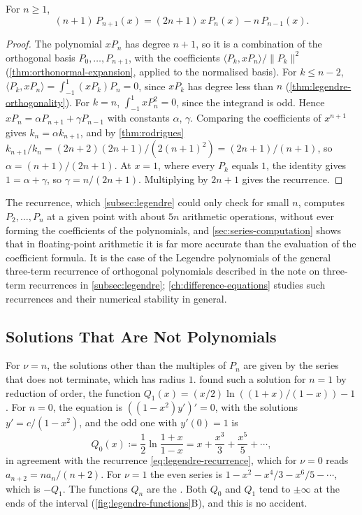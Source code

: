 \begin{theorem}
\label{thm:legendre-recurrence}
For $n\ge1$,
\[
(n+1)\,P_{n+1}(x)=(2n+1)\,x\,P_n(x)-n\,P_{n-1}(x) .
\]
\end{theorem}

\begin{proof}
The polynomial $xP_n$ has degree $n+1$, so it is a combination of the orthogonal basis $P_0,\ldots,P_{n+1}$, with the coefficients $\langle P_k,xP_n\rangle/\|P_k\|^2$ (\cref{thm:orthonormal-expansion}, applied to the normalised basis). For $k\le n-2$, $\langle P_k,xP_n\rangle=\int_{-1}^1(xP_k)P_n=0$, since $xP_k$ has degree less than $n$ (\cref{thm:legendre-orthogonality}). For $k=n$, $\int_{-1}^1xP_n^2=0$, since the integrand is odd. Hence $xP_n=\alpha P_{n+1}+\gamma P_{n-1}$ with constants $\alpha$, $\gamma$. Comparing the coefficients of $x^{n+1}$ gives $k_n=\alpha k_{n+1}$, and by \cref{thm:rodrigues} $k_{n+1}/k_n=(2n+2)(2n+1)/(2(n+1)^2)=(2n+1)/(n+1)$, so $\alpha=(n+1)/(2n+1)$. At $x=1$, where every $P_k$ equals $1$, the identity gives $1=\alpha+\gamma$, so $\gamma=n/(2n+1)$. Multiplying by $2n+1$ gives the recurrence.
\end{proof}

The recurrence, which \cref{subsec:legendre} could only check for small $n$, computes $P_2,\ldots,P_n$ at a given point with about $5n$ arithmetic operations, without ever forming the coefficients of the polynomials, and \cref{sec:series-computation} shows that in floating-point arithmetic it is far more accurate than the evaluation of the coefficient formula. It is the case of the Legendre polynomials of the general three-term recurrence of orthogonal polynomials described in the note on three-term recurrences in \cref{subsec:legendre}; \cref{ch:difference-equations} studies such recurrences and their numerical stability in general.

\subsection{Solutions That Are Not Polynomials}

For $\nu=n$, the solutions other than the multiples of $P_n$ are given by the series that does not terminate, which has radius $1$.  found such a solution for $n=1$ by reduction of order, the function $Q_1(x)=(x/2)\ln((1+x)/(1-x))-1$. For $n=0$, the equation is $((1-x^2)y')'=0$, with the solutions $y'=c/(1-x^2)$, and the odd one with $y'(0)=1$ is
\[
Q_0(x)\coloneqq\frac12\ln\frac{1+x}{1-x}=x+\frac{x^3}3+\frac{x^5}5+\cdots ,
\]
in agreement with the recurrence \eqref{eq:legendre-recurrence}, which for $\nu=0$ reads $a_{n+2}=na_n/(n+2)$. For $\nu=1$ the even series is $1-x^2-x^4/3-x^6/5-\cdots$, which is $-Q_1$. The functions $Q_n$ are the . Both $Q_0$ and $Q_1$ tend to $\pm\infty$ at the ends of the interval (\cref{fig:legendre-functions}B), and this is no accident.

